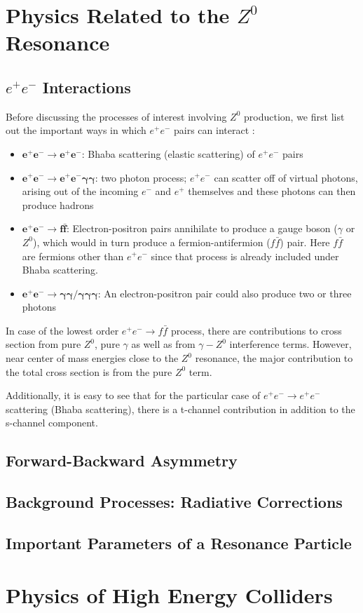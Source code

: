 \section{Physics Related to the $Z^{0}$ Resonance}
\subsection{$e^{+}e^{-}$ Interactions}
Before discussing the processes of interest involving $Z^{0}$ production, we first list out the important ways in which $e^{+}e^{-}$ pairs can interact \cite{UB}:
\begin{itemize}
\item $\bm{e^{+}e^{-}\rightarrow e^{+}e^{-}}$: Bhaba scattering (elastic scattering) of $e^{+}e^{-}$ pairs 
\item $\bm{e^{+}e^{-}\rightarrow e^{+}e^{-}\gamma \gamma}$: two photon process; $e^{+}e^{-}$ can scatter off of virtual photons, arising out of the incoming $e^{-}$ and $e^{+}$ themselves and these photons can then produce hadrons
\item $\bm{e^{+}e^{-}\rightarrow f \bar{f}}$: Electron-positron pairs annihilate to produce a gauge boson ($\gamma$ or $Z^{0}$), which would in turn produce a fermion-antifermion ($f\bar{f}$) pair. Here $f\bar{f}$ are fermions other than $e^{+}e^{-}$ since that process is already included under Bhaba scattering.
\item $\bm{e^{+}e^{-}\rightarrow \gamma \gamma / \gamma \gamma \gamma}$: An electron-positron pair could also produce two or three photons 
\end{itemize}

In case of the lowest order $e^{+}e^{-}\rightarrow f \bar{f}$ process, there are contributions to cross section from pure $Z^{0}$, pure $\gamma$ as well as from $\gamma - Z^{0}$ interference terms. However, near center of mass energies close to the $Z^{0}$ resonance, the major contribution to the total cross section is from the pure $Z^{0}$ term.

Additionally, it is easy to see that for the particular case of $e^{+}e^{-}\rightarrow e^{+}e^{-}$ scattering (Bhaba scattering), there is a t-channel contribution in addition to the s-channel component.
\subsection{Forward-Backward Asymmetry}
\subsection{Background Processes: Radiative Corrections}
\subsection{Important Parameters of a Resonance Particle}

\section{Physics of High Energy Colliders}